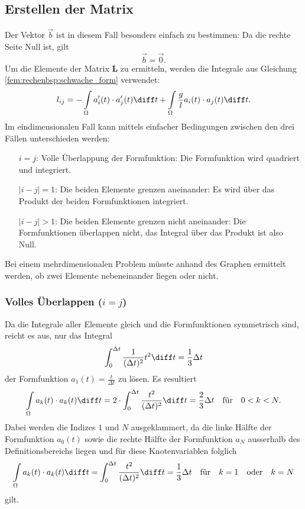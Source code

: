 \subsection{Erstellen der Matrix}
Der Vektor $\vec{b}$ ist in diesem Fall besonders einfach zu bestimmen: Da die rechte Seite Null ist, gilt
\begin{equation}
    \vec{b} = \vec{0}.
\end{equation}
Um die Elemente der Matrix $\mathbf{L}$ zu ermitteln, werden die Integrale aus Gleichung \ref{fem:rechenbsp:schwache_form} verwendet:
\begin{equation}
    l_{ij} = - \int\limits_\Omega a_i'(t) \cdot a_j'(t) \diff t + \int\limits_\Omega \frac{g}{l} a_i(t) \cdot a_j(t) \diff t.
\end{equation}
Im eindimensionalen Fall kann mittels einfacher Bedingungen zwischen den drei Fällen unterschieden werden:
\begin{itemize}
    \item[$i = j$:] Volle Überlappung der Formfunktion: Die Formfunktion wird quadriert und integriert. 
    \item[$|i - j| = 1$:] Die beiden Elemente grenzen aneinander: Es wird über das Produkt der beiden Formfunktionen integriert.
    \item[$|i - j| > 1$:] Die beiden Elemente grenzen nicht aneinander: Die Formfunktionen überlappen nicht, das Integral über das Produkt ist also Null.
\end{itemize}
Bei einem mehrdimensionalen Problem müsste anhand des Graphen ermittelt werden, ob zwei Elemente nebeneinander liegen oder nicht.

\subsubsection{Volles Überlappen ($i = j$)}
Da die Integrale aller Elemente gleich und die Formfunktionen symmetrisch sind, reicht es aus, nur das Integral
\begin{equation}
    \int_{0}^{\Delta t} \frac{1}{(\Delta t)^2} t^2 \diff t = \frac{1}{3} \Delta t
\end{equation}
der Formfunktion $ a_1(t) = \frac{t}{\Delta t} $ zu lösen.
Es resultiert
\begin{equation}
    \int\limits_\Omega a_k(t) \cdot a_k(t) \diff t = 2 \cdot \int_{0}^{\Delta t} \frac{t^2}{(\Delta t)^2} \diff t = \frac{2}{3} \Delta t \quad \text{für} \quad 0 < k < N.
\end{equation}
Dabei werden die Indizes $1$ und $N$ ausgeklammert, da die linke Hälfte der Formfunktion $a_0(t)$ sowie die rechte Hälfte der Formfunktion $a_N$ ausserhalb des Definitionsbereichs liegen und für diese Knotenvariablen folglich
\begin{equation}
    \int\limits_\Omega a_k(t) \cdot a_k(t) \diff t = \int_{0}^{\Delta t} \frac{t^2}{(\Delta t)^2} \diff t = \frac{1}{3} \Delta t \quad \text{für} \quad k = 1 \quad \text{oder} \quad k = N
\end{equation}
gilt.

